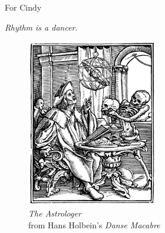 
\noindent For Cindy

\vspace{\baselineskip}

\noindent \emph{Rhythm is a dancer.}

\begin{figure}
    \vspace{50pt}
    \centering
    \includegraphics[width=0.51\textwidth]{assets/holbein-astrologer.jpg}
    \\
    \emph{The Astrologer}
    \\
    from Hans Holbein's \emph{Danse Macabre}
\end{figure}